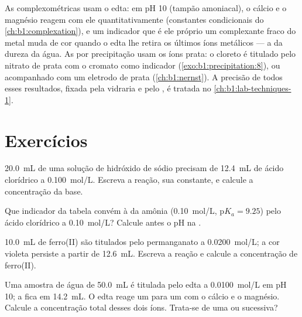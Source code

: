 As  complexométricas usam o edta: em pH 10 (tampão amoniacal),
o cálcio e o magnésio reagem com ele quantitativamente (constantes
condicionais do \cref{ch:b1:complexation}), e um indicador que é ele
próprio um complexante fraco do metal muda de cor quando o edta lhe
retira os últimos íons metálicos --- a  da dureza da água. As
 por precipitação usam os íons prata: o cloreto é titulado
pelo nitrato de prata com o cromato como indicador
(\cref{exo:b1:precipitation:8}), ou acompanhado com um eletrodo de prata
(\cref{ch:b1:nernst}). A precisão de todos esses resultados, fixada pela
vidraria e pelo , é tratada no
\cref{ch:b1:lab-techniques-1}.

\section{Exercícios}

\begin{exercise}[$\star$]\label{exo:b1:titration-methods:1}
\qty{20.0}{mL} de uma solução de hidróxido de sódio precisam de
\qty{12.4}{mL} de ácido clorídrico a \qty{0.100}{mol/L}. Escreva a
reação, sua constante, e calcule a concentração da base.
\end{exercise}

\begin{exercise}[$\star$]\label{exo:b1:titration-methods:2}
Que indicador da tabela convém à  da amônia (\qty{0.10}{mol/L},
$\mathrm{p}K_a = 9.25$) pelo ácido clorídrico a \qty{0.10}{mol/L}? Calcule
antes o pH na .
\end{exercise}

\begin{exercise}[$\star$]\label{exo:b1:titration-methods:3}
\qty{10.0}{mL} de ferro(II) são titulados pelo permanganato a
\qty{0.0200}{mol/L}; a cor violeta persiste a partir de \qty{12.6}{mL}.
Escreva a reação e calcule a concentração de ferro(II).
\end{exercise}

\begin{exercise}[$\star$]\label{exo:b1:titration-methods:4}
Uma amostra de água de \qty{50.0}{mL} é titulada pelo edta a
\qty{0.0100}{mol/L} em pH 10; a  fica em \qty{14.2}{mL}. O
edta reage um para um com o cálcio e o magnésio. Calcule a concentração
total desses dois íons. Trata-se de uma  ou
sucessiva?
\end{exercise}

